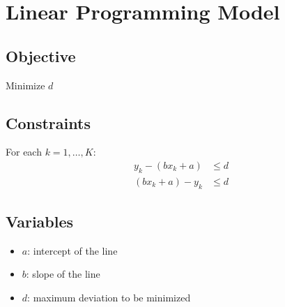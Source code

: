 \documentclass{article}
\begin{document}
\section*{Linear Programming Model}

\subsection*{Objective}
Minimize \( d \)

\subsection*{Constraints}
For each \( k = 1, \ldots, K \):
\begin{align*}
y_k - (bx_k + a) & \leq d \\
(bx_k + a) - y_k & \leq d
\end{align*}

\subsection*{Variables}
\begin{itemize}
    \item \( a \): intercept of the line
    \item \( b \): slope of the line
    \item \( d \): maximum deviation to be minimized
\end{itemize}
\end{document}

